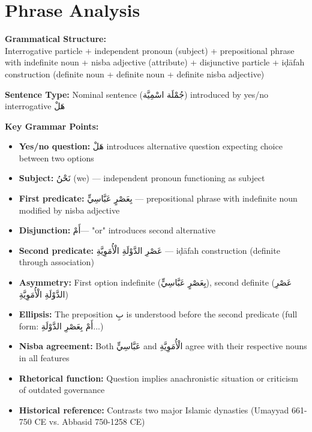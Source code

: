 \documentclass[letterpaper,12pt]{article}
\begin{document}
\section{Phrase Analysis}
\noindent
\begin{tcolorbox}[colback=boxcolor,colframe=headercolor,breakable]
\textbf{Grammatical Structure:}\\
Interrogative particle + independent pronoun (subject) + prepositional phrase with indefinite noun + nisba adjective (attribute) + disjunctive particle + iḍāfah construction (definite noun + definite noun + definite nisba adjective)

\vspace{0.5em}
\textbf{Sentence Type:} Nominal sentence (\textarabic{جُمْلَة اسْمِيَّة}) introduced by yes/no interrogative \textarabic{هَلْ}

\vspace{0.5em}
\textbf{Key Grammar Points:}
\begin{itemize}
\item \textbf{Yes/no question:} \textarabic{هَلْ} introduces alternative question expecting choice between two options
\item \textbf{Subject:} \textarabic{نَحْنُ} (we) — independent pronoun functioning as subject
\item \textbf{First predicate:} \textarabic{بِعَصْرٍ عَبَّاسِيٍّ} — prepositional phrase with indefinite noun modified by nisba adjective
\item \textbf{Disjunction:} \textarabic{أَمْ}— "or" introduces second alternative
\item \textbf{Second predicate:} \textarabic{عَصْرِ الدَّوْلَةِ الْأُمَوِيَّةِ} — iḍāfah construction (definite through association)
\item \textbf{Asymmetry:} First option indefinite (\textarabic{بِعَصْرٍ عَبَّاسِيٍّ}), second definite (\textarabic{عَصْرِ الدَّوْلَةِ الْأُمَوِيَّةِ})
\item \textbf{Ellipsis:} The preposition \textarabic{بِ} is understood before the second predicate (full form: \textarabic{أَمْ بِعَصْرِ الدَّوْلَةِ...})
\item \textbf{Nisba agreement:} Both \textarabic{عَبَّاسِيٍّ} and \textarabic{الْأُمَوِيَّةِ} agree with their respective nouns in all features
\item \textbf{Rhetorical function:} Question implies anachronistic situation or criticism of outdated governance
\item \textbf{Historical reference:} Contrasts two major Islamic dynasties (Umayyad 661-750 CE vs. Abbasid 750-1258 CE)
\end{itemize}
\end{tcolorbox}
\end{document}

